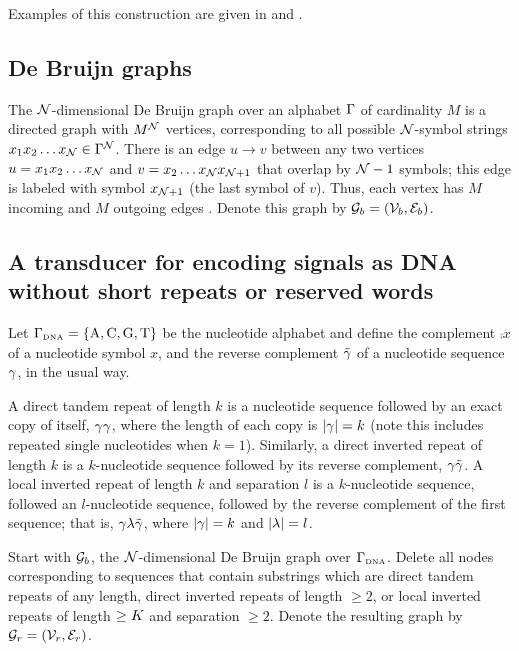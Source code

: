 \documentclass[english]{article}
\begin{document}
Examples of this construction are given in \cite{MohriPereiraRiley2000} and \cite{WestessonEtAlArxiv2012,WestessonEtAl2012}.

\subsection*{De Bruijn graphs}

The ${\cal N}$-dimensional De Bruijn graph over an alphabet $\Gamma$ of cardinality $M$
is a directed graph with $M^{\cal N}$ vertices,
corresponding to all possible ${\cal N}$-symbol strings
$x_1 x_2 \ldots x_{\cal N} \in \Gamma^{\cal N}$.
There is an edge $u \to v$ between any two vertices
$u=x_1 x_2 \ldots x_{\cal N}$ and $v=x_2 \ldots x_{\cal N} x_{{\cal N}+1}$
that overlap by ${\cal N}-1$ symbols; this edge is labeled with symbol $x_{{\cal N}+1}$ (the last symbol of $v$).
Thus, each vertex has $M$ incoming and $M$ outgoing edges \cite{DeBruijn1946,PevznerEtAl2001}.
Denote this graph by ${\cal G}_b = ({\cal V}_b,{\cal E}_b)$.

\subsection*{A transducer for encoding signals as DNA without short repeats or reserved words}

Let $\Gamma_{\mbox{\tiny DNA}} = \{ \mbox{A}, \mbox{C}, \mbox{G}, \mbox{T} \} $ be the nucleotide alphabet and define the complement $\comp{x}$ of a nucleotide symbol $x$,
and the reverse complement $\tilde{\gamma}$ of a nucleotide sequence $\gamma$, in the usual way.

A direct tandem repeat of length $k$ is a nucleotide sequence followed by an exact copy of itself, $\gamma \gamma$, where the length of each copy is $|\gamma|=k$
(note this includes repeated single nucleotides when $k=1$).
Similarly, a direct inverted repeat of length $k$ is a $k$-nucleotide sequence followed by its reverse complement, $\gamma \tilde{\gamma}$.
A local inverted repeat of length $k$ and separation $l$ is a $k$-nucleotide sequence, followed an $l$-nucleotide sequence, followed by the reverse complement
of the first sequence; that is, $\gamma \lambda \tilde{\gamma}$, where $|\gamma|=k$ and $|\lambda|=l$.

Start with ${\cal G}_b$, the ${\cal N}$-dimensional De Bruijn graph over $\Gamma_{\mbox{\tiny DNA}}$.
Delete all nodes corresponding to sequences that contain substrings which are
direct tandem repeats of any length,
direct inverted repeats of length $\geq 2$,
or local inverted repeats of length $\geq K$ and separation $\geq 2$.
Denote the resulting graph by ${\cal G}_r = ({\cal V}_r,{\cal E}_r)$.
\end{document}
